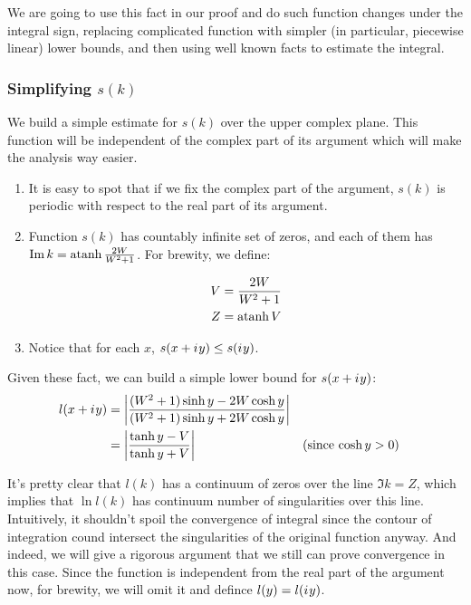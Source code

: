 We are going to use this fact in our proof and do such function changes under the integral sign, replacing complicated function with simpler (in particular, piecewise linear) lower bounds, and then using well known facts to estimate the integral.

\subsubsection{Simplifying $s(k)$}
We build a simple estimate for $s(k)$ over the upper complex plane. This function will be independent of the complex part of its argument which will make the analysis way easier.

\begin{enumerate}
\item
  It is easy to spot that if we fix the complex part of the argument, $s(k)$ is periodic with respect to the real part of its argument.
\item 
  Function $s(k)$ has countably infinite set of zeros, and each of them has $\Im k = \atanh \frac{2 W}{W^2 + 1}$. For brewity, we define:

  \begin{equation*}
  \begin{aligned}
     V &= \frac{2 W}{W^2 + 1}
  \\ Z &= \atanh V
  \end{aligned}
  \end{equation*}
\item
  Notice that for each $x$, $s(x + {i\mkern1mu} y) \le s({i\mkern1mu} y)$.  
\end{enumerate}

Given these fact, we can build a simple lower bound for $s(x + {i\mkern1mu} y)$:
\begin{align*}
l(x + \iu y)
   &= \abs{\frac{(W^2 + 1) \sinh y - 2 W \cosh y}{(W^2 + 1) \sinh y + 2 W \cosh y}}
\\ &= \abs{\frac{\tanh y - V}{\tanh y + V}} && \text{(since $\cosh y > 0$)}
\end{align*}

It's pretty clear that $l(k)$ has a continuum of zeros over the line $\Im k = Z$, which implies that $\ln l(k)$ has continuum number of singularities over this line. Intuitively, it shouldn't spoil the convergence of integral since the contour of integration cound intersect the singularities of the original function anyway. And indeed, we will give a rigorous argument that we still can prove convergence in this case. Since the function is independent from the real part of the argument now, for brewity, we will omit it and defince $l(y) = l({i\mkern1mu} y)$.

